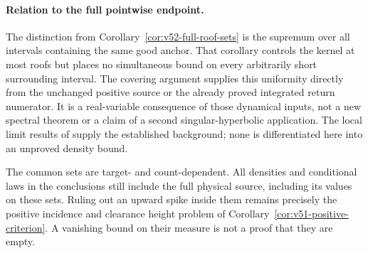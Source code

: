 \paragraph{Relation to the full pointwise endpoint.}
The distinction from Corollary~\ref{cor:v52-full-roof-sets} is the
supremum over all intervals containing the same good anchor. That
corollary controls the kernel at most roofs but places no simultaneous
bound on every arbitrarily short surrounding interval. The covering
argument supplies this uniformity directly from the unchanged positive
source or the already proved integrated return numerator. It is a
real-variable consequence of those dynamical inputs, not a new
spectral theorem or a claim of a second singular-hyperbolic application.
The local limit results of \cite{SV,DPZ,DN} supply the established
background; none is differentiated here into an unproved density bound.

The common sets are target- and count-dependent. All densities and
conditional laws in the conclusions still include the full physical
source, including its values on these sets. Ruling out an upward spike
inside them remains precisely the positive incidence and clearance
height problem of Corollary~\ref{cor:v51-positive-criterion}.
A vanishing bound on their measure is not a proof that they are empty.
